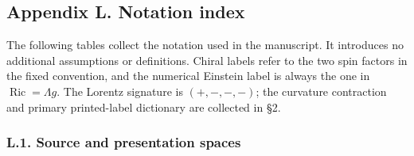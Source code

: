 \documentclass[
  english,
  11pt,
  reqno]{amsart}
\begin{document}
\protect{}\label{app:gg-notation}

\protect{}\label{sec:gg-notation-index}

\subsection{Appendix L. Notation
index}\label{appendix-l.-notation-index}

The following tables collect the notation used in the manuscript. It
introduces no additional assumptions or definitions. Chiral labels refer
to the two spin factors in the fixed convention, and the numerical
Einstein label is always the one in \(\operatorname{Ric}=\Lambda g\).
The Lorentz signature is \((+,-,-,-)\); the curvature contraction and
primary printed-label dictionary are collected in §2.

\protect{}\label{sec:gg-notation-source}

\subsubsection{L.1. Source and presentation
spaces}\label{l.1.-source-and-presentation-spaces}
\end{document}
